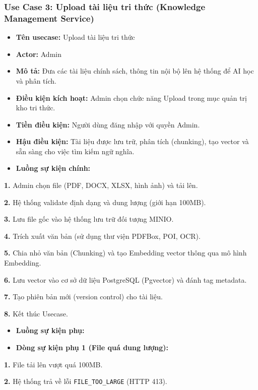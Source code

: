 \documentclass[12pt,a4paper]{report}
\begin{document}
\subsubsection{Use Case 3: Upload tài liệu tri thức (Knowledge Management Service)}
\begin{itemize}
    \item \textbf{Tên usecase:} Upload tài liệu tri thức
    \item \textbf{Actor:} Admin
    \item \textbf{Mô tả:} Đưa các tài liệu chính sách, thông tin nội bộ lên hệ thống để AI học và phân tích.
    \item \textbf{Điều kiện kích hoạt:} Admin chọn chức năng Upload trong mục quản trị kho tri thức.
    \item \textbf{Tiền điều kiện:} Người dùng đăng nhập với quyền Admin.
    \item \textbf{Hậu điều kiện:} Tài liệu được lưu trữ, phân tích (chunking), tạo vector và sẵn sàng cho việc tìm kiếm ngữ nghĩa.
    \item \textbf{Luồng sự kiện chính:}
\end{itemize}

\textbf{1.} Admin chọn file (PDF, DOCX, XLSX, hình ảnh) và tải lên.


\textbf{2.} Hệ thống validate định dạng và dung lượng (giới hạn 100MB).


\textbf{3.} Lưu file gốc vào hệ thống lưu trữ đối tượng MINIO.


\textbf{4.} Trích xuất văn bản (sử dụng thư viện PDFBox, POI, OCR).


\textbf{5.} Chia nhỏ văn bản (Chunking) và tạo Embedding vector thông qua mô hình Embedding.


\textbf{6.} Lưu vector vào cơ sở dữ liệu PostgreSQL (Pgvector) và đánh tag metadata.


\textbf{7.} Tạo phiên bản mới (version control) cho tài liệu.


\textbf{8.} Kết thúc Usecase.

\begin{itemize}
    \item \textbf{Luồng sự kiện phụ:}
    \item \textbf{Dòng sự kiện phụ 1 (File quá dung lượng):}
\end{itemize}

\textbf{1.} File tải lên vượt quá 100MB.


\textbf{2.} Hệ thống trả về lỗi \texttt{FILE\_TOO\_LARGE} (HTTP 413).
\end{document}
